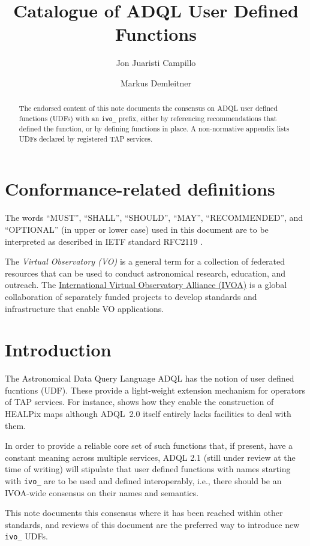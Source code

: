 \documentclass[11pt,a4paper]{ivoa}
\title{Catalogue of ADQL User Defined Functions}
\author{Jon Juaristi Campillo}
\author[https://wiki.ivoa.net/twiki/bin/view/IVOA/MarkusDemleitner]{Markus Demleitner}
\begin{document}
\begin{abstract}
The endorsed content of this note documents the consensus on ADQL user
defined functions (UDFs) with an \verb|ivo_| prefix, either by
referencing recommendations that defined the function, or by defining
functions in place.  A non-normative appendix lists UDFs declared by
registered TAP services.
\end{abstract}


\section*{Conformance-related definitions}

The words ``MUST'', ``SHALL'', ``SHOULD'', ``MAY'', ``RECOMMENDED'', and
``OPTIONAL'' (in upper or lower case) used in this document are to be
interpreted as described in IETF standard RFC2119 \citep{std:RFC2119}.

The \emph{Virtual Observatory (VO)} is a
general term for a collection of federated resources that can be used
to conduct astronomical research, education, and outreach.
The \href{http://www.ivoa.net}{International
Virtual Observatory Alliance (IVOA)} is a global
collaboration of separately funded projects to develop standards and
infrastructure that enable VO applications.


\section{Introduction}

The Astronomical Data Query Language ADQL \citep{2008ivoa.spec.1030O}
has the notion of user defined fucntions (UDF).  These provide a
light-weight extension mechanism for operators of TAP services.  
For instance, \citet{2016arXiv161109190T} shows how they enable the
construction of HEALPix maps although ADQL~2.0 itself entirely lacks
facilities to deal with them.

In order to provide a reliable core set of such functions that, if
present, have a constant meaning across multiple services, ADQL 2.1
(still under review at the time of writing) will stipulate that user
defined functions with names starting with \verb|ivo_| are to be used
and defined interoperably, i.e., there should be an IVOA-wide consensus
on their names and semantics. 

This note documents this consensus where it has been reached within
other standards, and reviews of this document are the preferred way to
introduce new \verb|ivo_| UDFs.
\end{document}
